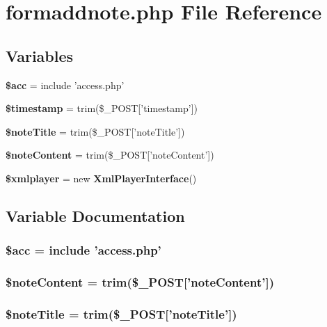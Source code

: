 \section{formaddnote.php File Reference}
\label{formaddnote_8php}


\subsection*{Variables}
\begin{CompactItemize}
\item 
{\bf \$acc} = include 'access.php'
\item 
{\bf \$timestamp} = trim(\$\_\-POST['timestamp'])
\item 
{\bf \$note\-Title} = trim(\$\_\-POST['note\-Title'])
\item 
{\bf \$note\-Content} = trim(\$\_\-POST['note\-Content'])
\item 
{\bf \$xmlplayer} = new {\bf Xml\-Player\-Interface}()
\end{CompactItemize}


\subsection{Variable Documentation}
\subsubsection{\setlength{\rightskip}{0pt plus 5cm}\$acc = include 'access.php'}\label{formaddnote_8php_542926c588a05eb69553d79c83cf73da}


\subsubsection{\setlength{\rightskip}{0pt plus 5cm}\$note\-Content = trim(\$\_\-POST['note\-Content'])}\label{formaddnote_8php_b4094634f228430d5301362d5d1b776a}


\subsubsection{\setlength{\rightskip}{0pt plus 5cm}\$note\-Title = trim(\$\_\-POST['note\-Title'])}\label{formaddnote_8php_c6965e9dbfc55b79644595c3ecebdc3b}



